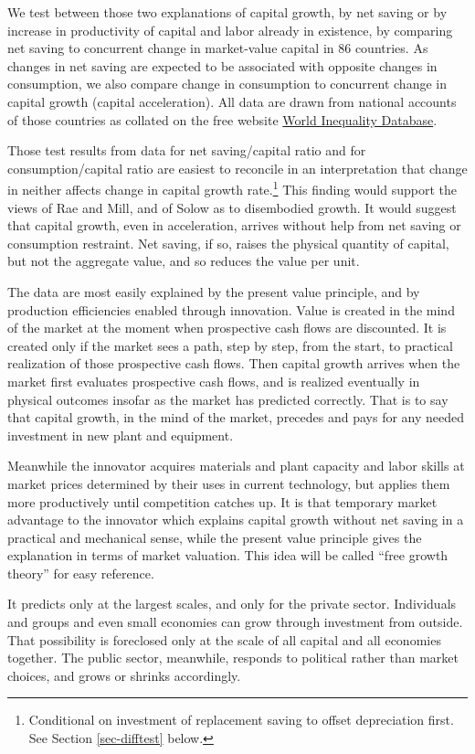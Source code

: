 \documentclass[a4paper,fleqn]{latex_styles/cas-sc}
\begin{document}
We test between those two explanations of capital growth, by net
saving or by increase in productivity of capital and labor already
in existence, by comparing net saving to concurrent change in
market-value capital in 86 countries. As changes in net saving
are expected to be associated with opposite changes in consumption, we
also compare change in consumption to concurrent change in capital
growth (capital acceleration). All data are drawn from national accounts
of those countries as collated on the free website \href{https://wid.world/}{World Inequality Database}.

Those test results from data for net saving/capital ratio and for consumption/capital ratio
are easiest to reconcile in an interpretation that change in neither affects
change in capital growth rate.\footnote{Conditional on investment of replacement saving to offset depreciation first. See Section \ref{sec-difftest}
below.} This finding would support the views of Rae and Mill, and of
Solow as to disembodied growth. It would suggest that capital growth, even in
acceleration, arrives without help from net saving or consumption restraint.
Net saving, if so, raises the physical quantity of capital, but not the
aggregate value, and so reduces the value per unit.

The data are most easily explained by the present value principle,
and by production efficiencies enabled through innovation. Value is
created in the mind of the market at the moment when prospective cash
flows are discounted. It is created only if the market sees a path, step
by step, from the start, to practical realization of those prospective
cash flows. Then capital growth arrives when the market first evaluates
prospective cash flows, and is realized eventually in physical outcomes
insofar as the market has predicted correctly. That is to say that capital
growth, in the mind of the market, precedes and pays for any needed investment
in new plant and equipment.

Meanwhile the innovator
acquires materials and plant capacity and labor skills at market prices
determined by their uses in current technology, but applies them more
productively until competition catches up. It is that temporary market
advantage to the innovator which explains capital growth without net
saving in a practical and mechanical sense, while the present value
principle gives the explanation in terms of market valuation. This idea
will be called ``free growth theory'' for easy reference.

It predicts only at the largest scales, and only for the private sector.
Individuals and groups and even small economies can grow through
investment from outside. That possibility is foreclosed only at the
scale of all capital and all economies together. The public sector,
meanwhile, responds to political rather than market choices, and grows
or shrinks accordingly.
\end{document}
